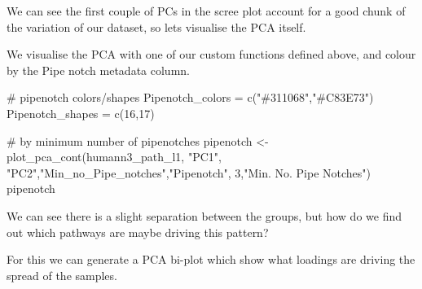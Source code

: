 \documentclass[
  letterpaper,
]{book}
\newenvironment{Shaded}{}{}
\newcommand{\AttributeTok}[1]{\textcolor[rgb]{0.84,0.23,0.29}{#1}}
\newcommand{\CommentTok}[1]{\textcolor[rgb]{0.42,0.45,0.49}{#1}}
\newcommand{\DecValTok}[1]{\textcolor[rgb]{0.00,0.36,0.77}{#1}}
\newcommand{\FunctionTok}[1]{\textcolor[rgb]{0.44,0.26,0.76}{#1}}
\newcommand{\NormalTok}[1]{\textcolor[rgb]{0.14,0.16,0.18}{#1}}
\newcommand{\OtherTok}[1]{\textcolor[rgb]{0.44,0.26,0.76}{#1}}
\newcommand{\SpecialCharTok}[1]{\textcolor[rgb]{0.00,0.36,0.77}{#1}}
\newcommand{\StringTok}[1]{\textcolor[rgb]{0.01,0.18,0.38}{#1}}
\begin{document}
\begin{Shaded}
\end{Shaded}

We can see the first couple of PCs in the scree plot account for a good
chunk of the variation of our dataset, so lets visualise the PCA itself.

We visualise the PCA with one of our custom functions defined above, and
colour by the Pipe notch metadata column.

\begin{Shaded}
\begin{Highlighting}[]
\CommentTok{\# pipenotch colors/shapes}
\NormalTok{Pipenotch\_colors }\OtherTok{=} \FunctionTok{c}\NormalTok{(}\StringTok{"\#311068"}\NormalTok{,}\StringTok{"\#C83E73"}\NormalTok{)}
\NormalTok{Pipenotch\_shapes }\OtherTok{=} \FunctionTok{c}\NormalTok{(}\DecValTok{16}\NormalTok{,}\DecValTok{17}\NormalTok{)}

\CommentTok{\# by minimum number of pipenotches}
\NormalTok{pipenotch }\OtherTok{\textless{}{-}} \FunctionTok{plot\_pca\_cont}\NormalTok{(humann3\_path\_l1, }\StringTok{"PC1"}\NormalTok{, }\StringTok{"PC2"}\NormalTok{,}\StringTok{"Min\_no\_Pipe\_notches"}\NormalTok{,}\StringTok{"Pipenotch"}\NormalTok{, }\DecValTok{3}\NormalTok{,}\StringTok{"Min. No. Pipe Notches"}\NormalTok{)}
\NormalTok{pipenotch}
\end{Highlighting}
\end{Shaded}

We can see there is a slight separation between the groups, but how do
we find out which pathways are maybe driving this pattern?

For this we can generate a PCA bi-plot which show what loadings are
driving the spread of the samples.
\end{document}
